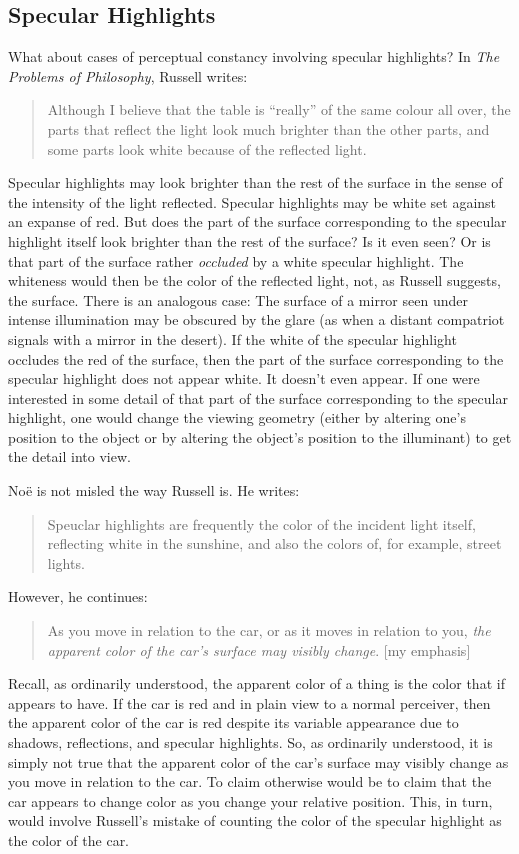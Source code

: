 \documentclass[12pt]{article}
\begin{document}

\subsection{Specular Highlights} %
\label{sub:specular_highlights}

What about cases of perceptual constancy involving specular highlights? In \emph{The Problems of Philosophy}, Russell writes:
	\begin{quote}
		Although I believe that the table is ``really'' of the same colour all over, the parts that reflect the light look much brighter than the other parts, and some parts look white because of the reflected light. \citep[2]{Russell:1912uq}
	\end{quote}
Specular highlights may look brighter than the rest of the surface in the sense of the intensity of the light reflected. Specular highlights may be white set against an expanse of red. But does the part of the surface corresponding to the specular highlight itself look brighter than the rest of the surface? Is it even seen? Or is that part of the surface rather \emph{occluded} by a white specular highlight. The whiteness would then be the color of the reflected light, not, as Russell suggests, the surface. There is an analogous case: The surface of a mirror seen under intense illumination may be obscured by the glare (as when a distant compatriot signals with a mirror in the desert). If the white of the specular highlight occludes the red of the surface, then the part of the surface corresponding to the specular highlight does not appear white. It doesn't even appear. If one were interested in some detail of that part of the surface corresponding to the specular highlight, one would change the viewing geometry (either by altering one's position to the object or by altering the object's position to the illuminant) to get the detail into view.

Noë is not misled the way Russell is. He writes:
	\begin{quote}
		Speuclar highlights are frequently the color of the incident light itself, reflecting white in the sunshine, and also the colors of, for example, street lights. \citep[125]{Noe:2004fk}
	\end{quote}
However, he continues:
	\begin{quote}
		As you move in relation to the car, or as it moves in relation to you, \emph{the apparent color of the car's surface may visibly change}. [my emphasis] \citep[125]{Noe:2004fk}
	\end{quote}
Recall, as ordinarily understood, the apparent color of a thing is the color that if appears to have. If the car is red and in plain view to a normal perceiver, then the apparent color of the car is red despite its variable appearance due to shadows, reflections, and specular highlights. So, as ordinarily understood, it is simply not true that the apparent color of the car's surface may visibly change as you move in relation to the car. To claim otherwise would be to claim that the car appears to change color as you change your relative position. This, in turn, would involve Russell's mistake of counting the color of the specular highlight as the color of the car. 
\end{document}
